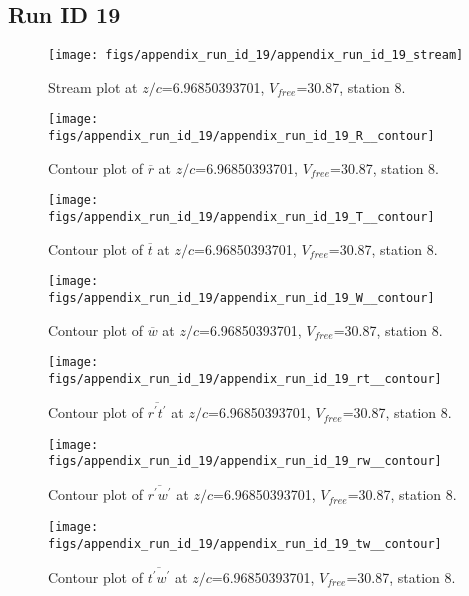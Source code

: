 \subsection{Run ID 19}
\begin{figure}[H]
\centering
\texttt{[image: figs/appendix\_run\_id\_19/appendix\_run\_id\_19\_stream]}
\caption{Stream plot at $z/c$=6.96850393701, $V_{free}$=30.87, station 8.}
\label{fig:appendix_run_id_19_stream}
\end{figure}


\begin{figure}[H]
\centering
\texttt{[image: figs/appendix\_run\_id\_19/appendix\_run\_id\_19\_R\_\_contour]}
\caption{Contour plot of $\overline{r}$ at $z/c$=6.96850393701, $V_{free}$=30.87, station 8.}
\label{fig:appendix_run_id_19_R__contour}
\end{figure}


\begin{figure}[H]
\centering
\texttt{[image: figs/appendix\_run\_id\_19/appendix\_run\_id\_19\_T\_\_contour]}
\caption{Contour plot of $\overline{t}$ at $z/c$=6.96850393701, $V_{free}$=30.87, station 8.}
\label{fig:appendix_run_id_19_T__contour}
\end{figure}


\begin{figure}[H]
\centering
\texttt{[image: figs/appendix\_run\_id\_19/appendix\_run\_id\_19\_W\_\_contour]}
\caption{Contour plot of $\overline{w}$ at $z/c$=6.96850393701, $V_{free}$=30.87, station 8.}
\label{fig:appendix_run_id_19_W__contour}
\end{figure}


\begin{figure}[H]
\centering
\texttt{[image: figs/appendix\_run\_id\_19/appendix\_run\_id\_19\_rt\_\_contour]}
\caption{Contour plot of $\overline{r^\prime t^\prime}$ at $z/c$=6.96850393701, $V_{free}$=30.87, station 8.}
\label{fig:appendix_run_id_19_rt__contour}
\end{figure}


\begin{figure}[H]
\centering
\texttt{[image: figs/appendix\_run\_id\_19/appendix\_run\_id\_19\_rw\_\_contour]}
\caption{Contour plot of $\overline{r^\prime w^\prime}$ at $z/c$=6.96850393701, $V_{free}$=30.87, station 8.}
\label{fig:appendix_run_id_19_rw__contour}
\end{figure}


\begin{figure}[H]
\centering
\texttt{[image: figs/appendix\_run\_id\_19/appendix\_run\_id\_19\_tw\_\_contour]}
\caption{Contour plot of $\overline{t^\prime w^\prime}$ at $z/c$=6.96850393701, $V_{free}$=30.87, station 8.}
\label{fig:appendix_run_id_19_tw__contour}
\end{figure}


